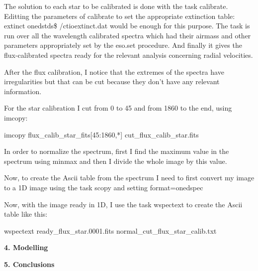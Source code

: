 \documentclass[english]{article}
\begin{document}
The solution to each star to be calibrated is done with the task calibrate. Editting the parameters of calibrate to set the appropriate extinction table: extinct onedstds\$ /ctioextinct.dat would be enough for this purpose. The task is run over all the wavelength calibrated spectra which had their airmass and other parameters appropriately set by the eso.set procedure. And finally it gives the flux-calibrated spectra ready for the relevant analysis concerning radial velocities.

After the flux calibration, I notice that the extremes of the spectra have irregularities but that can be cut because they don't have any relevant information.

For the star calibration I cut from 0 to 45 and from 1860 to the end, using imcopy:

\begin{center}
imcopy flux\_calib\_star\_fits[45:1860,*] cut\_flux\_calib\_star.fits
\end{center}

In order to normalize the spectrum, first I find the maximum value in the spectrum using minmax and then I divide the whole image by this value.

Now, to create the Ascii table from the spectrum I need to first convert my image to a 1D image using the task scopy and setting format=onedspec

Now, with the image ready in 1D, I use the task wspectext to create the Ascii table like this:

\begin{center}
wspectext ready\_flux\_star.0001.fits normal\_cut\_flux\_star\_calib.txt
\end{center}



\textbf{{\LARGE 4. Modelling}}



\textbf{{\LARGE 5. Conclusions}}
\end{document}
